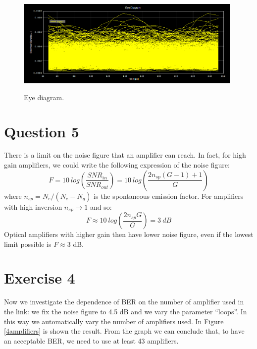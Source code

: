 \documentclass[a4paper,10pt]{report}
\begin{document}
\begin{figure}[!ht]
   \centering
   \includegraphics[width=11cm]{es42.png}\\
   \caption{Eye diagram.}
   \label{es42}
\end{figure}

\newpage
\section*{Question 5}
There is a limit on the noise figure that an amplifier can reach. In fact, for high gain amplifiers, we could write the following
expression of the noise figure:
$$F=10 \ log \left( \frac{SNR_{in}}{SNR_{out}} \right)=10 \ log \left( \frac{2 n_{sp} (G-1) +1}{G} \right)$$
where $n_{sp}=N_e/(N_e-N_g)$ is the spontaneous emission factor. For amplifiers with high inversion $n_{sp} \rightarrow 1$ and so:
$$F \approx 10 \ log \left( \frac{2 n_{sp} G}{G} \right)=3 \ dB$$
Optical amplifiers with higher gain then have lower noise figure, even if the lowest limit possible is $F \approx 3$ dB.


\section*{Exercise 4}
Now we investigate the dependence of BER on the number of amplifier used in the link: we fix the noise figure to 4.5 dB and we vary
the parameter ``loops''. In this way we automatically vary the number of amplifiers used.
In Figure \ref{4amplifiers} is shown the result. From the graph we can conclude that, to have an acceptable BER, we need to use
at least 43 amplifiers.
\end{document}
